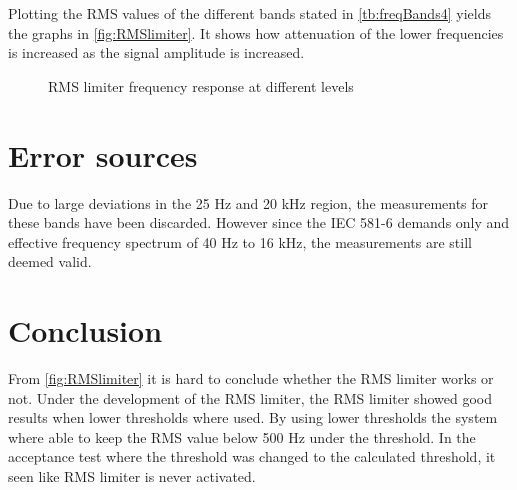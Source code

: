 Plotting the RMS values of the different bands stated in \autoref{tb:freqBands4} yields the graphs in \autoref{fig:RMSlimiter}. It shows how attenuation of the lower frequencies is increased as the signal amplitude is increased.

\begin{figure}[H]
	\centering
	
	\caption{RMS limiter frequency response at different levels}
	\label{fig:RMSlimiter}
\end{figure}


\section{Error sources}

Due to large deviations in the 25 Hz and 20 kHz region, the measurements for these bands have been discarded. However since the IEC 581-6 demands only and effective frequency spectrum of 40 Hz to 16 kHz, the measurements are still deemed valid.

\section{Conclusion}

From \autoref{fig:RMSlimiter} it is hard to conclude whether the RMS limiter works or not. Under the development of the RMS limiter, the RMS limiter showed good results when lower thresholds where used. By using lower thresholds the system where able to keep the RMS value below 500 Hz under the threshold. In the acceptance test where the threshold was changed to the calculated threshold, it seen like RMS limiter is never activated. 



